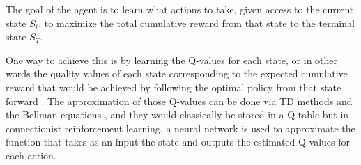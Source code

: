 The goal of the agent is to learn what actions to take, given access to the current state $S_t$, to maximize the total cumulative reward from that state to the terminal state $S_T$.

One way to achieve this is by learning the Q-values for each state, or in other words the quality values of each state corresponding to the expected cumulative reward that would be achieved by following the optimal policy from that state forward \citep{sutton_barto_2018}. The approximation of those Q-values can be done via TD methods and the Bellman equations \citep{sutton_barto_2018}, and they would classically be stored in a Q-table but in connectionist reinforcement learning, a neural network is used to approximate the function that takes as an input the state and outputs the estimated Q-values for each action.